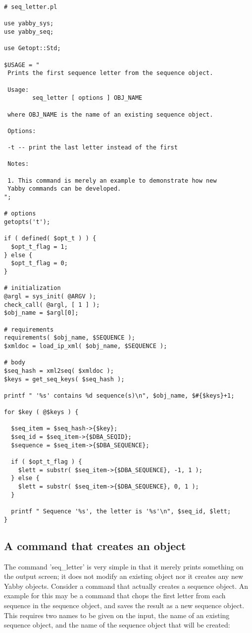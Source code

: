 \begin{verbatim}
# seq_letter.pl

use yabby_sys;
use yabby_seq;

use Getopt::Std;

$USAGE = "
 Prints the first sequence letter from the sequence object. 

 Usage:
        seq_letter [ options ] OBJ_NAME

 where OBJ_NAME is the name of an existing sequence object.

 Options:

 -t -- print the last letter instead of the first

 Notes:

 1. This command is merely an example to demonstrate how new
 Yabby commands can be developed.
";

# options
getopts('t');

if ( defined( $opt_t ) ) {
  $opt_t_flag = 1;
} else {
  $opt_t_flag = 0;
}

# initialization
@argl = sys_init( @ARGV );
check_call( @argl, [ 1 ] );
$obj_name = $argl[0];

# requirements
requirements( $obj_name, $SEQUENCE );
$xmldoc = load_ip_xml( $obj_name, $SEQUENCE );

# body
$seq_hash = xml2seq( $xmldoc );
$keys = get_seq_keys( $seq_hash );

printf " '%s' contains %d sequence(s)\n", $obj_name, $#{$keys}+1;

for $key ( @$keys ) {

  $seq_item = $seq_hash->{$key};
  $seq_id = $seq_item->{$DBA_SEQID};
  $sequence = $seq_item->{$DBA_SEQUENCE};

  if ( $opt_t_flag ) {
    $lett = substr( $seq_item->{$DBA_SEQUENCE}, -1, 1 );
  } else {
    $lett = substr( $seq_item->{$DBA_SEQUENCE}, 0, 1 );
  }

  printf " Sequence '%s', the letter is '%s'\n", $seq_id, $lett;
}
\end{verbatim}

\subsection{A command that creates an object}

The command 'seq\_letter' is very simple in that it merely prints
something on the output screen; it does not modify an existing
object nor it creates any new Yabby objects. Consider a command
that actually creates a sequence object. An example for this may
be a command that chops the first letter from each sequence in
the sequence object, and saves the result as a new sequence object.
This requires two names to be given on the input, the name of
an existing sequence object, and the name of the sequence object
that will be created:

